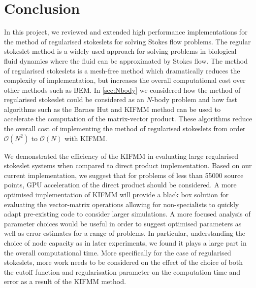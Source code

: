 \FloatBarrier
\section{Conclusion}
In this project, we reviewed and extended high performance implementations for the method of regularised stokeslets for solving Stokes flow problems. The regular stokeslet method is a widely used approach for solving problems in biological fluid dynamics where the fluid can be approximated by Stokes flow. The method of regularised stokeslets is a mesh-free method which dramatically reduces the complexity of implementation, but increases the overall computational cost over other methods such as BEM. In \cref{sec:Nbody} we considered how the method of regularised stokeslet could be considered as an $N$-body problem and how fast algorithms such as the Barnes Hut and KIFMM method can be used to accelerate the computation of the matrix-vector product. These algorithms reduce the overall cost of implementing the method of regularised stokeslets from order $\mathcal{O}(N^2)$ to $\mathcal{O}(N)$ with KIFMM. 

We demonstrated the efficiency of the KIFMM in evaluating large regularised stokeslet systems when compared to direct product implementation. Based on our current implementation, we suggest that for problems of less than 55000 source points, GPU acceleration of the direct product should be considered. A more optimised implementation of KIFMM will provide a black box solution for evaluating the vector-matrix operations allowing for non-specialists to quickly adapt pre-existing code to consider larger simulations. A more focused analysis of parameter choices would be useful in order to suggest optimised parameters as well as error estimates for a range of problems. In particular, understanding the choice of node capacity as in later experiments, we found it plays a large part in the overall computational time. More specifically for the case of regularised stokeslets, more work needs to be considered on the effect of the choice of both the cutoff function and regularisation parameter on the computation time and error as a result of the KIFMM method.

